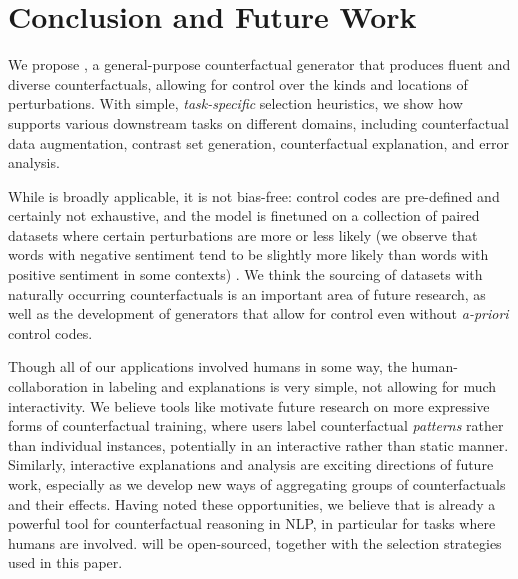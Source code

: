 \section{Conclusion and Future Work}
\label{sec:discuss}

We propose \sysname, a general-purpose counterfactual generator that produces fluent and diverse counterfactuals, allowing for control over the kinds and locations of perturbations. 
With simple, \emph{task-specific} selection heuristics, we show how \sysname supports various downstream tasks on different domains, including counterfactual data augmentation, contrast set generation, counterfactual explanation, and error analysis.

While \sysname is broadly applicable, it is not bias-free: control codes are pre-defined and certainly not exhaustive, and the model is finetuned on a collection of paired datasets where certain perturbations are more or less likely (\eg we observe that words with negative sentiment tend to be slightly more likely than words with positive sentiment in some contexts) . We think the sourcing of datasets with naturally occurring counterfactuals is an important area of future research, as well as the development of generators that allow for control even without \emph{a-priori} control codes.

Though all of our applications involved humans in some way, the human-\sysname collaboration in labeling and explanations is very simple, not allowing for much interactivity. 
We believe tools like \sysname motivate future research on more expressive forms of counterfactual training, where users label counterfactual \emph{patterns} rather than individual instances, potentially in an interactive rather than static manner. 
Similarly, interactive explanations and analysis are exciting directions of future work, especially as we develop new ways of aggregating groups of counterfactuals and their effects. Having noted these opportunities, we believe that \sysname is already a powerful tool for counterfactual reasoning in NLP, in particular for tasks where humans are involved. \sysname will be open-sourced, together with the selection strategies used in this paper.



